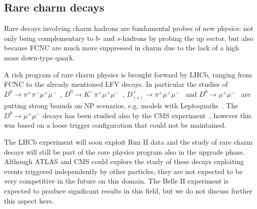 \subsection{Rare charm decays}

Rare decays involving charm hadrons are fundamental probes of new physics: 
not only being complementary to $b$- and $s$-hadrons by probing the up sector, 
but also because FCNC are much more suppressed in charm due to the lack of a high mass down-type quark. 

A rich program of rare charm physics is brought forward by LHCb, ranging from FCNC to the already mentioned LFV decays. 
In particular the studies of $D^0\to \pi^+ \pi^- \mu^+\mu^-$~\cite{Aaij:2013uoa}, 
$D^0\to K^- \pi^+ \mu^+\mu^-$~\cite{Aaij:2015hva}, $D^+_{(s)}\to \pi^+ \mu^+\mu^-$~\cite{Aaij:2013sua} and $D^0\to \mu^+\mu^-$~\cite{Aaij:2013cza}
are putting strong bounds on NP scenarios, e.g. models with Leptoquarks~\cite{Bauer:2015knc}.
The $D^0 \to \mu^+ \mu^-$ decays has been studied also by the CMS experiment~\cite{Pedrini:2012vp}, however this was based on a loose trigger
configuration that could not be maintained.

The LHCb experiment will soon exploit Run II data and the study of rare charm decays will still be part of the core physics program
also in the upgrade phase. 
Although ATLAS and CMS could explore the study of these decays exploiting events triggered independently by other particles, they are not expected to be very competitive in the future on this domain. 
The Belle II experiment is expected to produce significant results in this field, but we do not discuss further this aspect here. 

